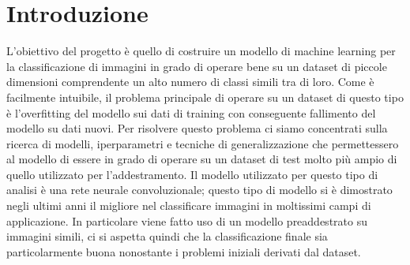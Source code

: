 \section{Introduzione}
L'obiettivo del progetto è quello di costruire un modello di machine learning per la classificazione di immagini in grado di operare bene su un dataset di piccole dimensioni comprendente un alto numero di classi simili tra di loro.
Come è facilmente intuibile, il problema principale di operare su un dataset di questo tipo è l'overfitting del modello sui dati di training con conseguente fallimento del modello su dati nuovi. Per risolvere questo problema ci siamo concentrati sulla ricerca di modelli, iperparametri e tecniche di generalizzazione che permettessero al modello di essere in grado di operare su un dataset di test molto più ampio di quello utilizzato per l'addestramento.
Il modello utilizzato per questo tipo di analisi è una rete neurale convoluzionale; questo tipo di modello si è dimostrato negli ultimi anni il migliore nel classificare immagini in moltissimi campi di applicazione.
In particolare viene fatto uso di un modello preaddestrato su immagini simili, ci si aspetta quindi che la classificazione finale sia particolarmente buona nonostante i problemi iniziali derivati dal dataset.

